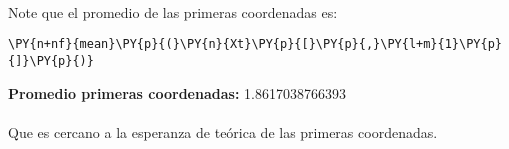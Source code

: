 \\
Note que el promedio de las primeras coordenadas es:
    \begin{tcolorbox}[breakable, size=fbox, boxrule=1pt, pad at break*=1mm,colback=cellbackground, colframe=cellborder]
\begin{Verbatim}[commandchars=\\\{\}]
\PY{n+nf}{mean}\PY{p}{(}\PY{n}{Xt}\PY{p}{[}\PY{p}{,}\PY{l+m}{1}\PY{p}{]}\PY{p}{)}
\end{Verbatim}
\end{tcolorbox}
\vspace*{2mm}
\textbf{Promedio primeras coordenadas:}    1.8617038766393\\
\\
Que es cercano a la esperanza de teórica de las primeras coordenadas.
